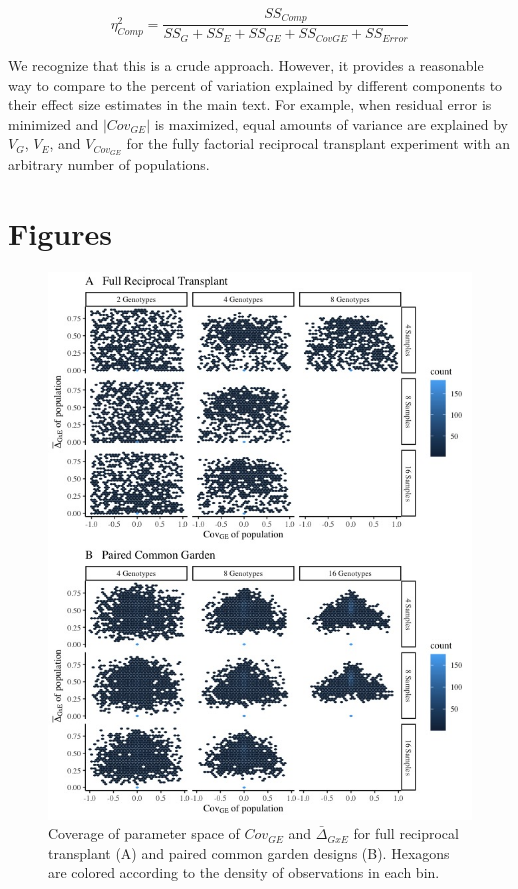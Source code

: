 \documentclass[11pt, oneside]{amsart}
\begin{document}
\begin{equation}
\eta^2_{Comp} =  \frac{SS_{Comp}}{SS_G + SS_E + SS_{GE} + SS_{CovGE} + SS_{Error}}
\end{equation}

We recognize that this is a crude approach. However, it provides a reasonable way to compare to the percent of variation explained by different components to their effect size estimates in the main text. For example, when residual error is minimized and $| Cov_{GE} |$ is maximized, equal amounts of variance are explained by $V_G$, $V_E$, and $V_{Cov_{GE}}$ for the fully factorial reciprocal transplant experiment with an arbitrary number of populations. 


\clearpage
\newpage

\renewcommand\thesection{Supplemental Figures}


\section{Figures}

\renewcommand{\figurename}{Supplementary Figure}

\renewcommand\thefigure{S1}
\begin{figure}[h]
\begin{center}
\includegraphics[width=6in]{3.11.HexPanel.jpeg}
\end{center}
\label{Fig: Parameter Coverage}
\caption{Coverage of parameter space of $Cov_{GE}$ and $\bar\Delta_{GxE}$ for full reciprocal transplant (A) and paired common garden designs (B). Hexagons are colored according to the density of observations in each bin. }
\end{figure}
\end{document}
